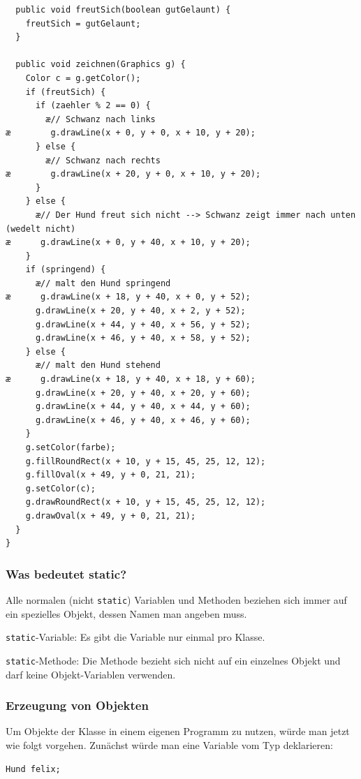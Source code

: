 \begin{lstlisting}
  public void freutSich(boolean gutGelaunt) {
    freutSich = gutGelaunt;
  }

  public void zeichnen(Graphics g) {
    Color c = g.getColor();
    if (freutSich) {
      if (zaehler % 2 == 0) {
        æ// Schwanz nach links
æ        g.drawLine(x + 0, y + 0, x + 10, y + 20);
      } else {
        æ// Schwanz nach rechts
æ        g.drawLine(x + 20, y + 0, x + 10, y + 20);
      }
    } else {
      æ// Der Hund freut sich nicht --> Schwanz zeigt immer nach unten (wedelt nicht)
æ      g.drawLine(x + 0, y + 40, x + 10, y + 20);
    }
    if (springend) {
      æ// malt den Hund springend
æ      g.drawLine(x + 18, y + 40, x + 0, y + 52);
      g.drawLine(x + 20, y + 40, x + 2, y + 52);
      g.drawLine(x + 44, y + 40, x + 56, y + 52);
      g.drawLine(x + 46, y + 40, x + 58, y + 52);
    } else {
      æ// malt den Hund stehend
æ      g.drawLine(x + 18, y + 40, x + 18, y + 60);
      g.drawLine(x + 20, y + 40, x + 20, y + 60);
      g.drawLine(x + 44, y + 40, x + 44, y + 60);
      g.drawLine(x + 46, y + 40, x + 46, y + 60);
    }
    g.setColor(farbe);
    g.fillRoundRect(x + 10, y + 15, 45, 25, 12, 12);
    g.fillOval(x + 49, y + 0, 21, 21);
    g.setColor(c);
    g.drawRoundRect(x + 10, y + 15, 45, 25, 12, 12);
    g.drawOval(x + 49, y + 0, 21, 21);
  }
}
\end{lstlisting}


\subsubsection{Was bedeutet static?}

Alle normalen (nicht \lstinline|static|) Variablen und Methoden beziehen sich
immer auf ein spezielles Objekt, dessen Namen man angeben muss.

\lstinline|static|-Variable: Es gibt die Variable nur einmal pro Klasse.

\lstinline|static|-Methode: Die Methode bezieht sich nicht auf ein einzelnes
Objekt und darf keine Objekt-Variablen verwenden.

\subsubsection{Erzeugung von Objekten}

Um Objekte der Klasse  in einem eigenen Programm zu nutzen, würde
man jetzt wie folgt vorgehen. Zunächst würde man eine Variable vom Typ 
deklarieren:

\begin{lstlisting}
Hund felix;
\end{lstlisting}

